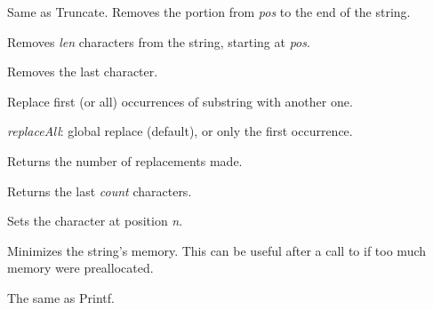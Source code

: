 
Same as Truncate. Removes the portion from {\it pos} to the end of the string.


Removes {\it len} characters from the string, starting at {\it pos}.

\label{wxstringremovelast}


Removes the last character.

\label{wxstringreplace}


Replace first (or all) occurrences of substring with another one.

{\it replaceAll}: global replace (default), or only the first occurrence.

Returns the number of replacements made.

\label{wxstringright}


Returns the last {\it count} characters.

\label{wxstringsetchar}


Sets the character at position {\it n}.

\label{wxstringshrink}


Minimizes the string's memory. This can be useful after a call to 
 if too much memory were preallocated.

\label{wxstringsprintf}


The same as Printf.

\label{wxstringstartswith}


